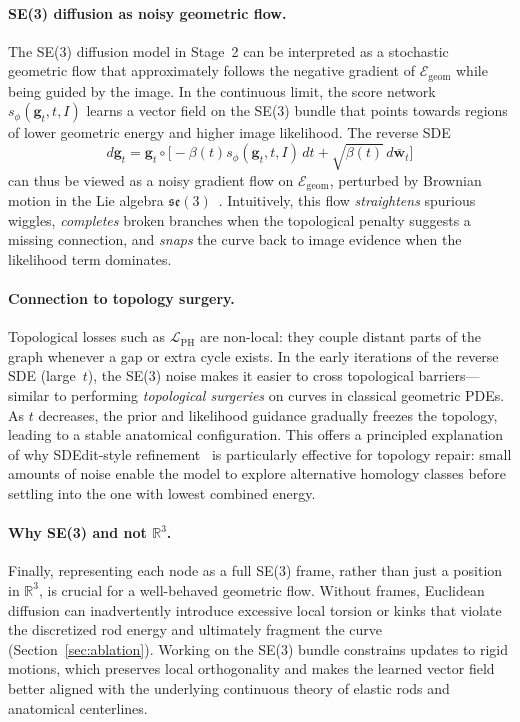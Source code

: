 \documentclass{article}
\begin{document}
\paragraph{SE(3) diffusion as noisy geometric flow.}
The SE(3) diffusion model in Stage~2 can be interpreted as a stochastic geometric flow that approximately follows the negative gradient of $\mathcal{E}_{\text{geom}}$ while being guided by the image. In the continuous limit, the score network $s_\phi(\mathbf{g}_t,t,I)$ learns a vector field on the SE(3) bundle that points towards regions of lower geometric energy and higher image likelihood. The reverse SDE
\begin{equation}
  d\mathbf{g}_t 
  = \mathbf{g}_t \circ 
    \big[-\beta(t) s_\phi(\mathbf{g}_t,t,I)\,dt 
    + \sqrt{\beta(t)}\,d\bar{\mathbf{w}}_t\big]
\end{equation}
can thus be viewed as a noisy gradient flow on $\mathcal{E}_{\text{geom}}$, perturbed by Brownian motion in the Lie algebra $\mathfrak{se}(3)$~\cite{song2021score,yim2024se3,anonymous_icml}. Intuitively, this flow \emph{straightens} spurious wiggles, \emph{completes} broken branches when the topological penalty suggests a missing connection, and \emph{snaps} the curve back to image evidence when the likelihood term dominates.

\paragraph{Connection to topology surgery.}
Topological losses such as $\mathcal{L}_{\text{PH}}$ are non-local: they couple distant parts of the graph whenever a gap or extra cycle exists. In the early iterations of the reverse SDE (large~$t$), the SE(3) noise makes it easier to cross topological barriers—similar to performing \emph{topological surgeries} on curves in classical geometric PDEs. As $t$ decreases, the prior and likelihood guidance gradually freezes the topology, leading to a stable anatomical configuration. This offers a principled explanation of why SDEdit-style refinement~\cite{meng2022sdedit,lugmayr2022repaint} is particularly effective for topology repair: small amounts of noise enable the model to explore alternative homology classes before settling into the one with lowest combined energy.

\paragraph{Why SE(3) and not $\mathbb{R}^3$.}
Finally, representing each node as a full SE(3) frame, rather than just a position in $\mathbb{R}^3$, is crucial for a well-behaved geometric flow. Without frames, Euclidean diffusion can inadvertently introduce excessive local torsion or kinks that violate the discretized rod energy and ultimately fragment the curve (Section~\ref{sec:ablation}). Working on the SE(3) bundle constrains updates to rigid motions, which preserves local orthogonality and makes the learned vector field better aligned with the underlying continuous theory of elastic rods and anatomical centerlines.
 
\end{document}
